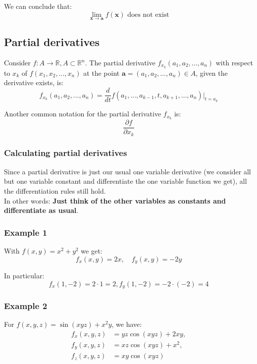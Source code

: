 \documentclass[11pt]{article}
\begin{document}
We can conclude that:
\[\lim_{\boldsymbol{x} \rightarrow \boldsymbol{a}} f(\boldsymbol{x}) \text{ does not exist}\]

\newpage

\subsection{Partial derivatives}
\label{sec:org18da805}
Consider \(f : A \rightarrow \mathbb{R}, A \subset \mathbb{R}^n\). The partial derivative \(f_{x_k} (a_1, a_2, \ldots, a_n)\) with respect to \(x_k\) of \(f(x_1, x_2, \ldots, x_n)\) at the point \(\boldsymbol{a} = (a_1, a_2, \ldots, a_n) \in A\), given the derivative exists, is:
\[f_{x_k}(a_1, a_2, \ldots, a_n) = \frac{d}{dt} f(a_1, \ldots, a_{k - 1}, t, a_{k + 1}, \ldots, a_n)|_{t = a_k}\]

Another common notation for the partial derivative \(f_{x_k}\) is:
\[\frac{\partial f}{\partial x_k}\]

\subsubsection{Calculating partial derivatives}
\label{sec:org941dbec}
Since a partial derivative is just our usual one variable derivative (we consider all but one variable constant and differentiate the one variable function we get), all the differentiation rules still hold.
\\[0pt]

In other words: \textbf{Just think of the other variables as constants and differentiate as usual}.

\subsubsection{Example 1}
\label{sec:org581ed2e}
With \(f(x, y) = x^2 + y^2\) we get:
\[f_x(x, y) = 2x, \quad f_y(x, y) = -2y\]

In particular:
\[f_x(1, -2) = 2 \cdot 1 = 2, f_y (1, -2) = -2 \cdot (-2) = 4\]

\subsubsection{Example 2}
\label{sec:orgffa6936}
For \(f(x, y, z) = \sin (xyz) + x^2 y\), we have:
\begin{align}
f_x(x, y, z) &= yz \cos (xyz) + 2xy, \\
f_y(x, y, z) &= xz \cos (xyz) + x^2, \\
f_z(x, y, z) &= xy \cos (xyz)
\end{align}
\end{document}
